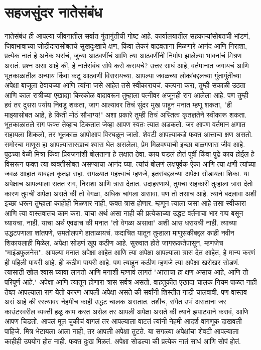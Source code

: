 \chapter{सहजसुंदर नातेसंबंध}
नातेसंबंध ही आपल्या जीवनातील सर्वात गुंतागुंतीची गोष्ट आहे. कार्यालयातील सहकाऱ्यांसोबतची भांडणं, जिवाभावाच्या जोडीदारासोबतचे सुखदुःखाचे क्षण, किंवा लेकरं वाढवताना मिळणारे आनंद आणि निराशा,  प्रत्येक नातं हे अनेक थरांचं, जुन्या आठवणींचं आणि त्या आठवणींनी निर्माण झालेल्या भावनांचं मिश्रण असतं.
प्रश्न असा आहे की, हे नातेसंबंध सोपे कसे करायचे? उत्तर साधं आहे,  वर्तमानात जगायचं आणि भूतकाळातील अन्याय किंवा कटू आठवणी विसरायच्या. आपल्या जवळच्या लोकांबद्दलच्या गुंतागुंतीच्या अपेक्षा बाजूला ठेवायच्या आणि त्यांना जसे आहेत तसे स्वीकारायचं.
कल्पना करा, तुम्ही सकाळी उठता आणि काल रात्रीच्या एखाद्या किरकोळ वादावरून तुम्हाला पत्नीवर अजूनही राग आलेला आहे. पण तुम्ही हवं तर दुसरा पर्याय निवडू शकता,  जाग आल्यावर तिचं सुंदर मुख पाहून मनात म्हणू शकता, "ही माझ्यासोबत आहे, हे किती मोठं सौभाग्य!" अशा प्रकारे तुम्ही तिचं अस्तित्व कृतज्ञतेने स्वीकारू शकता. भूतकाळातले राग फक्त तेव्हाच टिकतात जेव्हा आपण स्वतः त्यात अडकतो. जर आपण वर्तमान क्षणात राहायला शिकलो, तर भूतकाळ आपोआप विरघळून जातो.
शेवटी आपल्याकडे फक्त आत्ताचा क्षण असतो. समोरचा माणूस हा आपल्यासारखाच श्वास घेत असलेला, प्रेम मिळवण्याची इच्छा बाळगणारा जीव आहे. पुढच्या वेळी मित्रा किंवा प्रियजनांशी बोलताना हे लक्षात ठेवा. काय घडलं होतं पूर्वी किंवा पुढे काय होईल हे विसरून फक्त त्या व्यक्तीसोबत असण्याचा आनंद घ्या. त्यांचं बोलणं लक्षपूर्वक ऐका आणि त्या क्षणी त्यांच्या जवळ आहात याबद्दल कृतज्ञ राहा.
सगळ्यात महत्त्वाचं म्हणजे, इतरांबद्दलच्या अपेक्षा सोडायला शिका. या अपेक्षाच आपल्याला सतत राग, निराशा आणि त्रास देतात. उदाहरणार्थ, तुमचा सहकारी तुम्हाला त्रास देतो कारण तुमची अपेक्षा असते की तो वेगळा, अधिक चांगला असावा. पण तो तसाच आहे. त्याने बदलावा अशी इच्छा धरून तुम्हाला काहीही मिळणार नाही, फक्त त्रास होणार. म्हणून त्याला जसा आहे तसा स्वीकारा आणि त्या वास्तवातच काम करा.
याचा अर्थ असा नाही की प्रत्येकाच्या उद्धट वर्तनाचा भार गप्प बसून घ्यायचा. नाही. याचा अर्थ एवढाच की मनात "तो वेगळा असावा" अशी आस धरायची नाही. त्याच्या उद्धटपणाला शांतपणे, समतोलपणे हाताळायचं. कदाचित यातून तुम्हाला माणुसकीबद्दल काही नवीन शिकायलाही मिळेल.
अपेक्षा सोडणं खूप कठीण आहे. सुरुवात होते जागरूकतेपासून, म्हणजेच "माइंडफुलनेस". आपल्या मनात अपेक्षा आहेत आणि त्या अपेक्षा आपल्याला त्रास देत आहेत, हे मान्य करणं ही पहिली पायरी आहे. ही कठीण पायरी आहे. पण त्याहून कठीण म्हणजे त्या अपेक्षा खरोखर सोडणं. त्यासाठी खोल श्वास घ्यावा लागतो आणि मनाशी म्हणावं लागतं "आत्ताचा हा क्षण असाच आहे, आणि तो परिपूर्ण आहे."
अपेक्षा आणि त्यातून होणारा त्रास सर्वत्र असतो. वाहतुकीत एखादा चालक नियम पाळत नाही तेव्हा आपल्याला राग येतो कारण आपली अपेक्षा असते की सर्वांनी शिस्तीत गाडी चालवावी. पण वास्तव असं आहे की रस्त्यावर नेहमीच काही उद्धट चालक असतात. तशीच, रांगेत उभं असताना जर काउंटरवरील व्यक्ती हळू काम करत असेल तर आपली अपेक्षा असते की त्याने झपाट्याने करावं, आणि आपण चिडतो. आपलं मूल चुकीचं वागलं तर आपल्याला वाटतं त्यांनी नेहमी आदर्श वागणूक दाखवली पाहिजे. मित्र भेटायला आला नाही, तर आपली अपेक्षा तुटते.
या सगळ्या अपेक्षांचा शेवटी आपल्याला काहीही उपयोग होत नाही. फक्त दुःख मिळतं. अपेक्षा सोडल्या की प्रत्येक नातं साधं आणि सोपं होतं.
